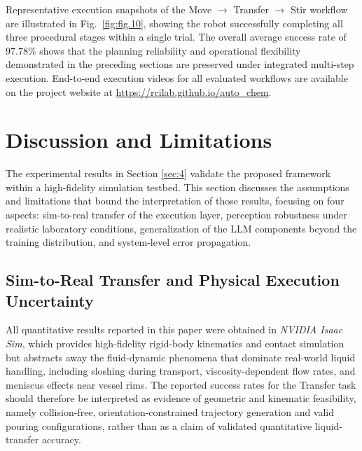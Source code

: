 \documentclass{ieeeaccess}
\begin{document}
Representative execution snapshots of the Move $\rightarrow$ Transfer $\rightarrow$ Stir workflow are illustrated in Fig.~\ref{fig:fig.10}, showing the robot successfully completing all three procedural stages within a single trial. The overall average success rate of 97.78\% shows that the planning reliability and operational flexibility demonstrated in the preceding sections are preserved under integrated multi-step execution. End-to-end execution videos for all evaluated workflows are available on the project website at \url{https://rcilab.github.io/auto_chem}.

\section{Discussion and Limitations}\label{sec:5}
The experimental results in Section \ref{sec:4} validate the proposed framework within a high-fidelity simulation testbed. This section discusses the assumptions and limitations that bound the interpretation of those results, focusing on four aspects: sim-to-real transfer of the execution layer, perception robustness under realistic laboratory conditions, generalization of the LLM components beyond the training distribution, and system-level error propagation.

\subsection{Sim-to-Real Transfer and Physical Execution Uncertainty}\label{sec:5.1}
All quantitative results reported in this paper were obtained in \textit{NVIDIA Isaac Sim}, which provides high-fidelity rigid-body kinematics and contact simulation but abstracts away the fluid-dynamic phenomena that dominate real-world liquid handling, including sloshing during transport, viscosity-dependent flow rates, and meniscus effects near vessel rims. The reported success rates for the Transfer task should therefore be interpreted as evidence of geometric and kinematic feasibility, namely collision-free, orientation-constrained trajectory generation and valid pouring configurations, rather than as a claim of validated quantitative liquid-transfer accuracy.
\end{document}
